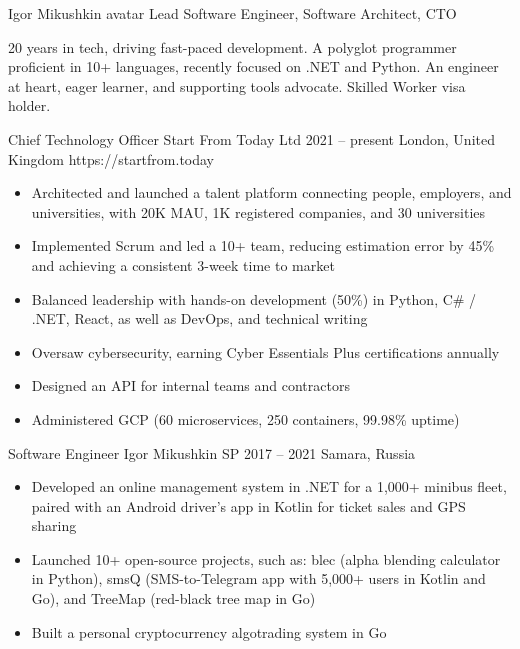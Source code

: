 \documentclass[9pt,a4paper]{juicv}
\begin{document}
\begin{paracol}{2}
\cvHeader
    {Igor Mikushkin}
    {avatar}
    {Lead Software Engineer, Software Architect, CTO}

20 years in tech, driving fast-paced development.
A polyglot programmer proficient in 10+ languages, recently focused on .NET and Python.
An engineer at heart, eager learner, and supporting tools advocate.
Skilled Worker visa holder.

    \cvLeftEvent
        {Chief Technology Officer}
        {Start From Today Ltd}
        {2021 -- present}
        {London, United Kingdom}
        {https://startfrom.today}

        \begin{itemize}
            \item Architected and launched a talent platform connecting people, employers, and universities,
                  with 20K MAU, 1K registered companies, and 30 universities
            \item Implemented Scrum and led a 10+ team,
                  reducing estimation error by 45\%
                  and achieving a consistent 3-week time to market
            \item Balanced leadership with hands-on development (50\%)
                  in Python, C\# / .NET, React, as well as DevOps, and technical writing
            \item Oversaw cybersecurity, earning Cyber Essentials Plus certifications annually
            \item Designed an API for internal teams and contractors
            \item Administered GCP (60 microservices, 250 containers, 99.98\% uptime)
        \end{itemize}

    \cvLeftEvent
        {Software Engineer}
        {Igor Mikushkin SP}
        {2017 -- 2021}
        {Samara, Russia}
        {}

        \begin{itemize}
            \item Developed an online management system in .NET for a 1,000+ minibus fleet,
                  paired with an Android driver’s app in Kotlin for ticket sales and GPS sharing
            \item Launched 10+ open-source projects, such as:
                  blec (alpha blending calculator in Python),
                  smsQ (SMS-to-Telegram app with 5,000+ users in Kotlin and Go),
                  and TreeMap (red-black tree map in Go)
            \item Built a personal cryptocurrency algotrading system in Go
        \end{itemize}


\end{paracol}
\end{document}

